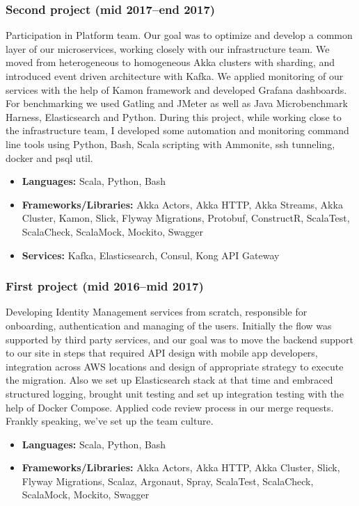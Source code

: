 \subsubsection*{Second project (mid 2017--end 2017)}

Participation in Platform team. Our goal was to optimize and develop a
common layer of our microservices, working closely with our
infrastructure team. We moved from heterogeneous to homogeneous Akka
clusters with sharding, and introduced event driven architecture with
Kafka. We applied monitoring of our services with the help of Kamon
framework and developed Grafana dashboards. For benchmarking we used
Gatling and JMeter as well as Java Microbenchmark Harness,
Elasticsearch and Python. During this project, while working close to
the infrastructure team, I developed some automation and monitoring
command line tools using Python, Bash, Scala scripting with Ammonite,
ssh tunneling, docker and psql util.

\begin{itemize}[noitemsep, nosep]
  \item \textbf{Languages:} Scala, Python, Bash
  \item \textbf{Frameworks/Libraries:} Akka Actors, Akka HTTP, Akka
Streams, Akka Cluster, Kamon, Slick, Flyway Migrations, Protobuf,
ConstructR, ScalaTest, ScalaCheck, ScalaMock, Mockito, Swagger
  \item \textbf{Services:} Kafka, Elasticsearch, Consul, Kong API
Gateway
\end{itemize}

\subsubsection*{First project (mid 2016--mid 2017)}

Developing Identity Management services from scratch, responsible for
onboarding, authentication and managing of the users. Initially the
flow was supported by third party services, and our goal was to move
the backend support to our site in steps that required API design with
mobile app developers, integration across AWS locations and design of
appropriate strategy to execute the migration. Also we set up
Elasticsearch stack at that time and embraced structured logging,
brought unit testing and set up integration testing with the help of
Docker Compose.  Applied code review process in our merge
requests. Frankly speaking, we've set up the team culture.

\begin{itemize}[noitemsep, nosep]
  \item \textbf{Languages:} Scala, Python, Bash
  \item \textbf{Frameworks/Libraries:} Akka Actors, Akka HTTP, Akka
Cluster, Slick, Flyway Migrations, Scalaz, Argonaut, Spray, ScalaTest,
ScalaCheck, ScalaMock, Mockito, Swagger
\end{itemize}
